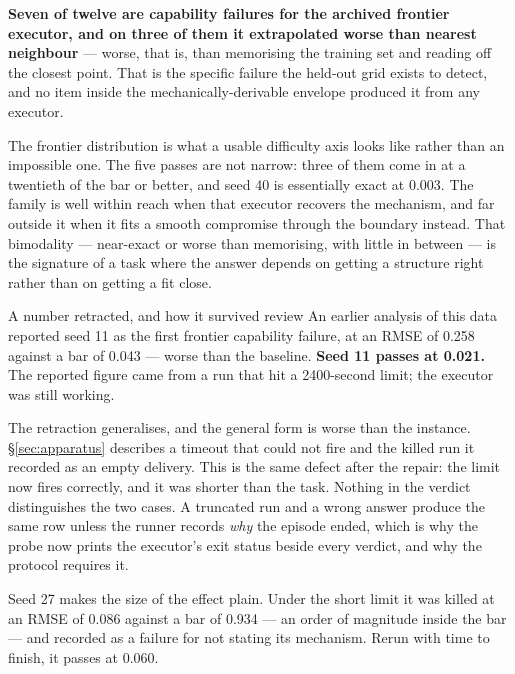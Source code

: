 \documentclass[11pt]{article}
\theoremstyle{definition}
\begin{document}
\textbf{Seven of twelve are capability failures for the archived frontier executor, and on three of them it extrapolated worse than nearest neighbour} --- worse, that is, than memorising the training set and reading off the closest point. That is the specific failure the held-out grid exists to detect, and no item inside the mechanically-derivable envelope produced it from any executor.

The frontier distribution is what a usable difficulty axis looks like rather than an impossible one. The five passes are not narrow: three of them come in at a twentieth of the bar or better, and seed 40 is essentially exact at 0.003. The family is well within reach when that executor recovers the mechanism, and far outside it when it fits a smooth compromise through the boundary instead. That bimodality --- near-exact or worse than memorising, with little in between --- is the signature of a task where the answer depends on getting a structure right rather than on getting a fit close.

\begin{cautionbox}{A number retracted, and how it survived review}
An earlier analysis of this data reported seed 11 as the first frontier capability failure, at an RMSE of 0.258 against a bar of 0.043 --- worse than the baseline. \textbf{Seed 11 passes at 0.021.} The reported figure came from a run that hit a 2400-second limit; the executor was still working.

The retraction generalises, and the general form is worse than the instance. \S\ref{sec:apparatus} describes a timeout that could not fire and the killed run it recorded as an empty delivery. This is the same defect after the repair: the limit now fires correctly, and it was shorter than the task. Nothing in the verdict distinguishes the two cases. A truncated run and a wrong answer produce the same row unless the runner records \emph{why} the episode ended, which is why the probe now prints the executor's exit status beside every verdict, and why the protocol requires it.

Seed 27 makes the size of the effect plain. Under the short limit it was killed at an RMSE of 0.086 against a bar of 0.934 --- an order of magnitude inside the bar --- and recorded as a failure for not stating its mechanism. Rerun with time to finish, it passes at 0.060.
\end{cautionbox}
\end{document}
